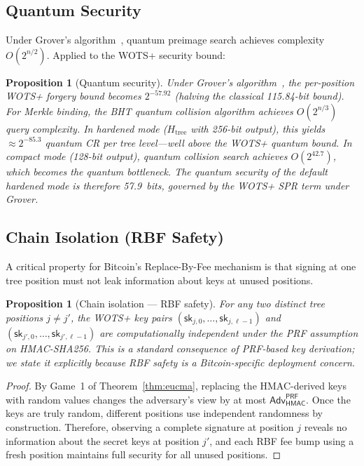 \documentclass[11pt,a4paper]{article}
\newtheorem{proposition}[theorem]{Proposition}
\theoremstyle{definition}
\begin{document}
\subsection{Quantum Security}
\label{sec:quantum}

Under Grover's algorithm~\cite{grover1996fast}, quantum preimage search achieves complexity $O(2^{n/2})$. Applied to the WOTS+ security bound:

\begin{proposition}[Quantum security]
Under Grover's algorithm~\cite{grover1996fast}, the per-position WOTS+ forgery bound becomes $2^{-57.92}$ (halving the classical 115.84-bit bound). For Merkle binding, the BHT quantum collision algorithm achieves $O(2^{n/3})$ query complexity. In hardened mode ($H_{\mathrm{tree}}$ with 256-bit output), this yields $\approx 2^{-85.3}$ quantum CR per tree level---well above the WOTS+ quantum bound. In compact mode (128-bit output), quantum collision search achieves $O(2^{42.7})$, which becomes the quantum bottleneck. The quantum security of the default hardened mode is therefore 57.9~bits, governed by the WOTS+ SPR term under Grover.
\end{proposition}

\subsection{Chain Isolation (RBF Safety)}
\label{sec:chain-isolation}

A critical property for Bitcoin's Replace-By-Fee mechanism is that signing at one tree position must not leak information about keys at unused positions.

\begin{proposition}[Chain isolation --- RBF safety]
\label{thm:chain-isolation}
For any two distinct tree positions $j \neq j'$, the WOTS+ key pairs $(\mathsf{sk}_{j,0}, \ldots, \mathsf{sk}_{j,\ell-1})$ and $(\mathsf{sk}_{j',0}, \ldots, \mathsf{sk}_{j',\ell-1})$ are computationally independent under the PRF assumption on HMAC-SHA256. This is a standard consequence of PRF-based key derivation; we state it explicitly because RBF safety is a Bitcoin-specific deployment concern.
\end{proposition}

\begin{proof}
By Game~1 of Theorem~\ref{thm:eucma}, replacing the HMAC-derived keys with random values changes the adversary's view by at most $\mathsf{Adv}^{\mathsf{PRF}}_{\mathsf{HMAC}}$. Once the keys are truly random, different positions use independent randomness by construction. Therefore, observing a complete signature at position $j$ reveals no information about the secret keys at position $j'$, and each RBF fee bump using a fresh position maintains full security for all unused positions.
\end{proof}
\end{document}
